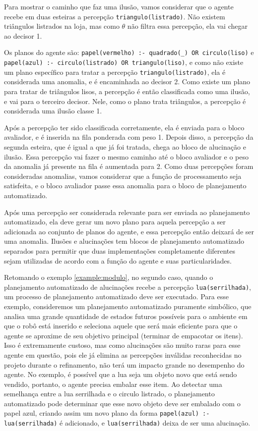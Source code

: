 \begin{example}
    Para mostrar o caminho que faz uma ilusão, vamos considerar que o agente recebe em duas esteiras a percepção \texttt{triangulo(listrado)}. Não existem triângulos listrados na loja, mas como $\theta$ não filtra essa percepção, ela vai chegar ao decisor 1. 
    
    Os planos do agente são: \texttt{papel(vermelho) :- quadrado(\_) OR circulo(liso)} e 
     \texttt{papel(azul) :- circulo(listrado) OR triangulo(liso)}, e como não existe um plano específico para tratar a percepção \texttt{triangulo(listrado)}, ela é considerada uma anomalia, e é encaminhada ao decisor 2. Como existe um plano para tratar de triângulos lisos, a percepção é então classificada como uma ilusão, e vai para o terceiro decisor. Nele, como o plano trata triângulos, a percepção é considerada uma ilusão classe 1. 
     
     Após a percepção ter sido classificada corretamente, ela é enviada para o bloco avaliador, e é inserida na fila ponderada com peso 1. Depois disso, a percepção da segunda esteira, que é igual a que já foi tratada, chega ao bloco de alucinação e ilusão. Essa percepção vai fazer o mesmo caminho até o bloco avaliador e o peso da anomalia já presente na fila é aumentada para 2. Como duas percepções foram consideradas anomalias, vamos considerar que a função de processamento seja satisfeita, e o bloco avaliador passe essa anomalia para o bloco de planejamento automatizado.
    
    Após uma percepção ser considerada relevante para ser enviada ao planejamento automatizado, ela deve gerar um novo plano para aquela percepção a ser adicionada ao conjunto de planos do agente, e essa percepção então deixará de ser uma anomalia. Ilusões e alucinações tem blocos de planejamento automatizado separados para permitir que duas implementações completamente diferentes sejam utilizadas de acordo com a função do agente e suas particularidades. 
    
    Retomando o exemplo \ref{example:modulo}, no segundo caso, quando o planejamento automatizado de alucinações recebe a percepção \texttt{lua(serrilhada)}, um processo de planejamento automatizado deve ser executado. Para esse exemplo, consideremos um planejamento automatizado puramente simbólico, que analisa uma grande quantidade de estados futuros possíveis para o ambiente em que o robô está inserido e seleciona aquele que será mais eficiente para que o agente se aproxime de seu objetivo principal (terminar de empacotar os itens). Isso é extremamente custoso, mas como alucinações são muito raras para esse agente em questão, pois ele já elimina as percepções inválidas reconhecidas no projeto durante o refinamento, não terá um impacto grande no desempenho do agente. No exemplo, é possível que a lua seja um objeto novo que está sendo vendido, portanto, o agente precisa embalar esse item. Ao detectar uma semelhança entre a lua serrilhada e o circulo listrado, o planejamento automatizado pode determinar que esse novo objeto deve ser embalado com o papel azul, criando assim um novo plano da forma \texttt{papel(azul) :- lua(serrilhada)} é adicionado, e \texttt{lua(serrilhada)} deixa de ser uma alucinação.


\end{example}
